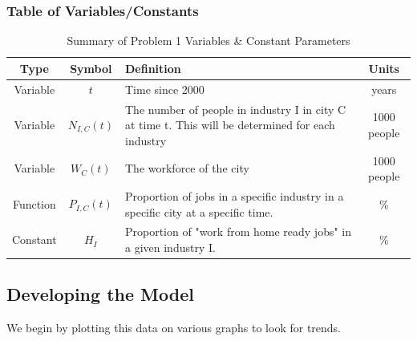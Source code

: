             \subsubsection{Table of Variables/Constants}
                \begin{table}[h!]
                  \begin{center}
                    \label{tab:variables1} %
                    \begin{tabular}{|c|c|p{6cm}|c|} %
                      \toprule 
                       \textbf{Type} & \textbf{Symbol} & \textbf{Definition} & \textbf{Units} \\
                      \midrule 
                      Variable & $t$ & Time since 2000  & years\\
                       Variable & $N_{I,C}(t)$ & The number of people in industry I in city C at time t. This will be determined for each industry & 1000 people  \\ %
                       Variable & $W_C(t)$ & The workforce of the city & 1000 people\\
                       Function & $P_{I,C}(t)$ & Proportion of jobs in a specific industry in a specific city at a specific time. & \% \\
                       
                       Constant & $H_{I}$ & Proportion of "work from home ready jobs" in a given industry I. & \% \\

                      \bottomrule 
                    \end{tabular}
                    \caption{Summary of Problem 1 Variables \& Constant Parameters}                
                  \end{center}
                \end{table}
            

            
        \subsection{Developing the Model}
            We begin by plotting this data on various graphs to look for trends.
        
